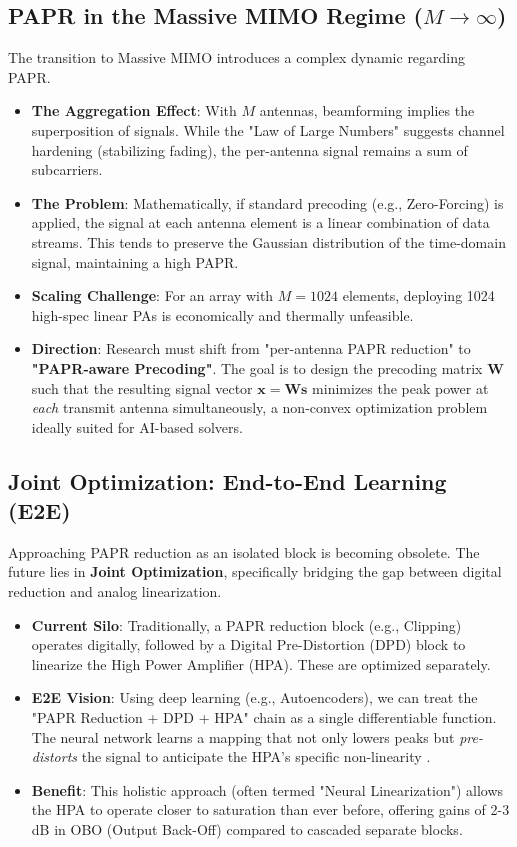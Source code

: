 \documentclass[12pt, a4paper, onecolumn]{article}
\begin{document}
\subsection{PAPR in the Massive MIMO Regime ($M \to \infty$)}
The transition to Massive MIMO introduces a complex dynamic regarding PAPR.

\begin{itemize}
    \item \textbf{The Aggregation Effect}: With $M$ antennas, beamforming implies the superposition of signals. While the "Law of Large Numbers" suggests channel hardening (stabilizing fading), the per-antenna signal remains a sum of subcarriers.
    \item \textbf{The Problem}: Mathematically, if standard precoding (e.g., Zero-Forcing) is applied, the signal at each antenna element is a linear combination of data streams. This tends to preserve the Gaussian distribution of the time-domain signal, maintaining a high PAPR.
    \item \textbf{Scaling Challenge}: For an array with $M=1024$ elements, deploying 1024 high-spec linear PAs is economically and thermally unfeasible.
    \item \textbf{Direction}: Research must shift from "per-antenna PAPR reduction" to \textbf{"PAPR-aware Precoding"}. The goal is to design the precoding matrix $\mathbf{W}$ such that the resulting signal vector $\mathbf{x} = \mathbf{W}\mathbf{s}$ minimizes the peak power at \textit{each} transmit antenna simultaneously, a non-convex optimization problem ideally suited for AI-based solvers.
\end{itemize}

\subsection{Joint Optimization: End-to-End Learning (E2E)}
Approaching PAPR reduction as an isolated block is becoming obsolete. The future lies in \textbf{Joint Optimization}, specifically bridging the gap between digital reduction and analog linearization.

\begin{itemize}
    \item \textbf{Current Silo}: Traditionally, a PAPR reduction block (e.g., Clipping) operates digitally, followed by a Digital Pre-Distortion (DPD) block to linearize the High Power Amplifier (HPA). These are optimized separately.
    \item \textbf{E2E Vision}: Using deep learning (e.g., Autoencoders), we can treat the "PAPR Reduction + DPD + HPA" chain as a single differentiable function. The neural network learns a mapping that not only lowers peaks but \textit{pre-distorts} the signal to anticipate the HPA's specific non-linearity \cite{ref13}.
    \item \textbf{Benefit}: This holistic approach (often termed "Neural Linearization") allows the HPA to operate closer to saturation than ever before, offering gains of 2-3 dB in OBO (Output Back-Off) compared to cascaded separate blocks.
\end{itemize}
\end{document}
